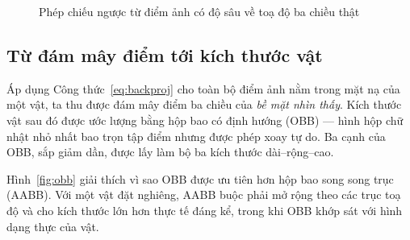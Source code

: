 \begin{figure}[H]
\centering
{}
\caption{Phép chiếu ngược từ điểm ảnh có độ sâu về toạ độ ba chiều thật}
\label{fig:backproj}
\end{figure}

\subsection{Từ đám mây điểm tới kích thước vật}

Áp dụng Công thức~\eqref{eq:backproj} cho toàn bộ điểm ảnh nằm trong mặt nạ của một vật, ta thu
được đám mây điểm ba chiều của \emph{bề mặt nhìn thấy}. Kích thước vật sau đó được ước lượng
bằng hộp bao có định hướng (OBB) --- hình hộp chữ nhật nhỏ nhất bao trọn tập điểm nhưng được
phép xoay tự do. Ba cạnh của OBB, sắp giảm dần, được lấy làm bộ ba kích thước dài--rộng--cao.

Hình~\ref{fig:obb} giải thích vì sao OBB được ưu tiên hơn hộp bao song song trục (AABB). Với một vật đặt nghiêng, AABB buộc phải mở rộng theo các trục toạ độ và cho kích thước lớn hơn thực tế đáng kể, trong khi OBB khớp sát với hình dạng thực của vật.

